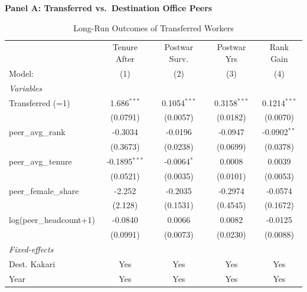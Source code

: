 \begin{table}[htbp]
\centering
\caption{Long-Run Outcomes of Transferred Workers}
\label{tab:transfer-outcomes}
\begin{threeparttable}

\textbf{Panel A: Transferred vs.\ Destination Office Peers}
\medskip

\begin{tabular}{lcccc}
   \tabularnewline \midrule \midrule
                                  & Tenure After    & Postwar Surv.      & Postwar Yrs     & Rank Gain \\   
   Model:                         & (1)             & (2)                & (3)             & (4)\\  
   \midrule
   \emph{Variables}\\
   Transferred (=1)               & 1.686$^{***}$   & 0.1054$^{***}$     & 0.3158$^{***}$  & 0.1214$^{***}$\\   
                                  & (0.0791)        & (0.0057)           & (0.0182)        & (0.0070)\\   
   peer\_avg\_rank                & -0.3034         & -0.0196            & -0.0947         & -0.0902$^{**}$\\   
                                  & (0.3673)        & (0.0238)           & (0.0699)        & (0.0378)\\   
   peer\_avg\_tenure              & -0.1895$^{***}$ & -0.0064$^{*}$      & 0.0008          & 0.0039\\   
                                  & (0.0521)        & (0.0035)           & (0.0101)        & (0.0053)\\   
   peer\_female\_share            & -2.252          & -0.2035            & -0.2974         & -0.0574\\   
                                  & (2.128)         & (0.1531)           & (0.4545)        & (0.1672)\\   
   log(peer\_headcount+1)         & -0.0840         & 0.0066             & 0.0082          & -0.0125\\   
                                  & (0.0991)        & (0.0073)           & (0.0230)        & (0.0088)\\   
   \midrule
   \emph{Fixed-effects}\\
   Dest. Kakari                   & Yes             & Yes                & Yes             & Yes\\  
   Year                           & Yes             & Yes                & Yes             & Yes\\  

\end{tabular}
\end{threeparttable}
\end{table}
